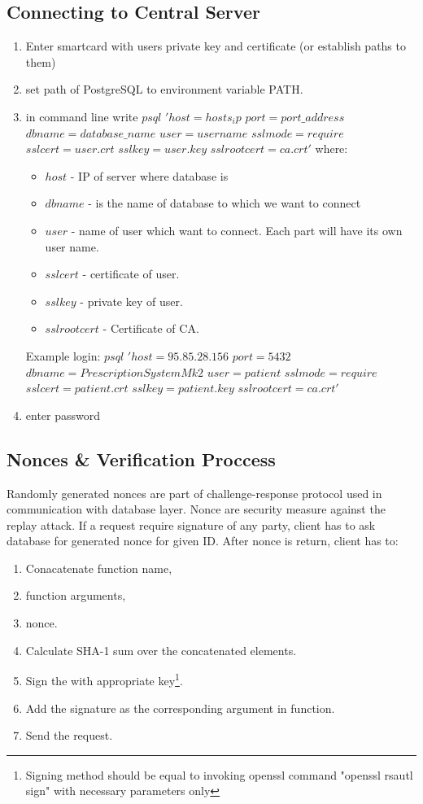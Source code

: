 \subsection{Connecting to Central Server}\label{sec:login}
\begin{enumerate}
\item Enter smartcard with users private key and certificate (or establish paths to them)
\item set path of PostgreSQL to environment variable PATH.

\item in command line write $psql$ $'host=hosts_ip$ $port=port\_address$ $dbname=database\_name$ $user=username$ $sslmode=require$ $sslcert=user.crt$ $sslkey=user.key$ $sslrootcert=ca.crt'$ where:
	\begin{itemize}
	\item $host$ - IP of server where database is
	\item $dbname$ - is the name of database to which we want to connect
	\item $user$ - name of user which want to connect. Each part will have its own user name.
	\item $sslcert$ - certificate of user.
	\item $sslkey$ - private key of user.
	\item $sslrootcert$ - Certificate of CA.
	\end{itemize}
	Example login: $psql$ $'host=95.85.28.156$ $port=5432$ $dbname=PrescriptionSystemMk2$ $user=patient$ $sslmode=require$ $sslcert=patient.crt$ $sslkey=patient.key$ $sslrootcert=ca.crt'$
\item enter password
\end{enumerate}

\subsection{Nonces \& Verification Proccess}

Randomly generated nonces are part of challenge-response protocol used in communication with database layer. Nonce are security measure against the replay attack. If a request require signature of any party, client has to ask database for generated nonce for given ID. After nonce is return, client has to:
\begin{enumerate}
 \item Conacatenate function name,
 \item function arguments,
 \item nonce.
 \item Calculate SHA-1 sum over the concatenated elements.
 \item Sign the with appropriate key\footnote{Signing method should be equal to invoking openssl command "openssl rsautl sign" with necessary parameters only}.
 \item Add the signature as the corresponding argument in function.
 \item Send the request.
\end{enumerate}


